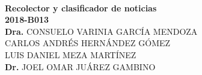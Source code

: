 \begin{center}


\ \\[1cm]
  \textbf{ \LARGE{R}\LARGE{ecolector} \LARGE{y} \LARGE{clasificador} \LARGE{de}  
  \LARGE{noticias}}\\[1cm]
  
  \large{\textbf{2018-B013}}\\[1cm]

  \large{\textbf{Dra.} CONSUELO VARINIA GARCÍA MENDOZA }\\
  \large{CARLOS ANDRÉS HERNÁNDEZ GÓMEZ}\\
  \large{LUIS DANIEL MEZA MARTÍNEZ}\\
  \large{\textbf{Dr.} JOEL OMAR JUÁREZ GAMBINO }\\




  

\end{center}

